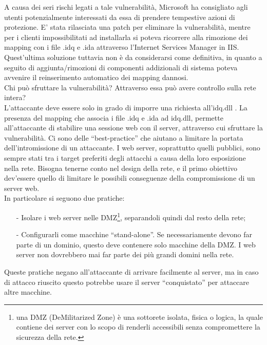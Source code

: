 A causa dei seri rischi legati a tale vulnerabilità, Microsoft ha consigliato agli utenti potenzialmente interessati da essa di prendere tempestive azioni di protezione. E’ stata rilasciata una patch per eliminare la vulnerabilità, mentre per i clienti impossibilitati ad installarla si poteva ricorrere alla rimozione dei mapping con i file .idq e .ida attraverso l’Internet Services Manager in IIS. Quest’ultima soluzione tuttavia non è da considerarsi come definitiva, in quanto a seguito di aggiunta/rimozioni di componenti addizionali di sistema poteva avvenire il reinserimento automatico dei mapping dannosi.\\

Chi può sfruttare la vulnerabilità? Attraverso essa può avere controllo sulla rete intera?\\
L’attaccante deve essere solo in grado di imporre una richiesta all’idq.dll . La presenza del mapping che associa i file .idq e .ida ad idq.dll, permette all’attaccante di stabilire una sessione web con il server, attraverso cui sfruttare la vulnerabilità.
Ci sono delle “best-practice” che aiutano a limitare la portata dell’intromissione di un attaccante. I web server, soprattutto quelli pubblici, sono sempre stati tra i target preferiti degli attacchi a causa della loro esposizione nella rete. Bisogna tenerne conto nel design della rete, e il primo obiettivo dev'essere quello di limitare le possibili conseguenze della compromissione di un server web.\\
In particolare si seguono due pratiche:
\begin{itemize}
\item[-]Isolare i web server nelle DMZ\footnote{una DMZ (DeMilitarized Zone) è una sottorete isolata, fisica o logica, la quale contiene dei server con lo scopo di renderli accessibili senza compromettere la sicurezza della rete.}, separandoli quindi dal resto della rete;\\
\item[-]Configurarli come macchine “stand-alone”. Se necessariamente devono far parte di un dominio, questo deve contenere solo macchine della DMZ. I web server non dovrebbero mai far parte dei più grandi domini nella rete.\\
\end{itemize}
Queste pratiche negano all’attaccante di arrivare facilmente al server, ma in caso di attacco riuscito questo potrebbe usare il server “conquistato” per attaccare altre macchine.\\
